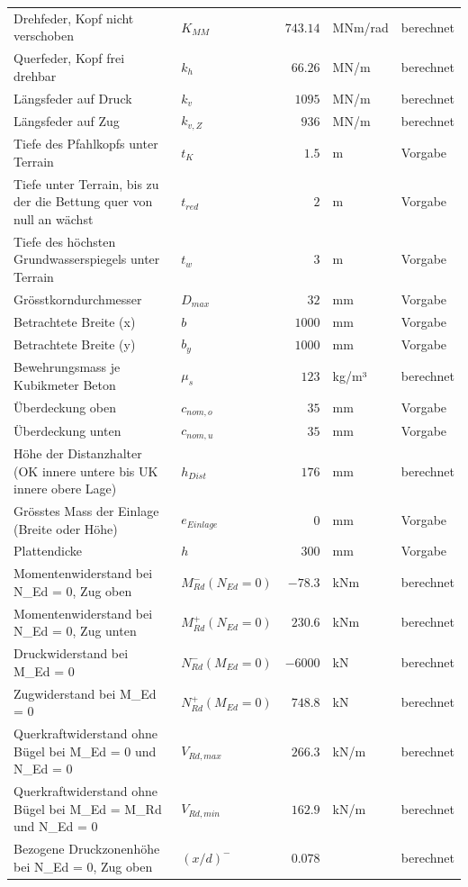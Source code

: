 \documentclass[11pt,a4paper]{article}
\begin{document}
\begin{xltabular}{\linewidth}{>{\raggedright\arraybackslash}Xlrll}
Drehfeder, Kopf nicht verschoben & $K_{MM}$ & $743.14$ & MNm/rad & berechnet \\
Querfeder, Kopf frei drehbar & $k_h$ & $66.26$ & MN/m & berechnet \\
Längsfeder auf Druck & $k_v$ & $1095$ & MN/m & berechnet \\
Längsfeder auf Zug & $k_{v,Z}$ & $936$ & MN/m & berechnet \\
Tiefe des Pfahlkopfs unter Terrain & $t_K$ & $1.5$ & m & Vorgabe \\
Tiefe unter Terrain, bis zu der die Bettung quer von null an wächst & $t_{red}$ & $2$ & m & Vorgabe \\
Tiefe des höchsten Grundwasserspiegels unter Terrain & $t_w$ & $3$ & m & Vorgabe \\
Grösstkorndurchmesser & $D_{max}$ & $32$ & mm & Vorgabe \\
Betrachtete Breite (x) & $b$ & $1000$ & mm & Vorgabe \\
Betrachtete Breite (y) & $b_y$ & $1000$ & mm & Vorgabe \\
Bewehrungsmass je Kubikmeter Beton & $\mu_s$ & $123$ & kg/m³ & berechnet \\
Überdeckung oben & $c_{nom,o}$ & $35$ & mm & Vorgabe \\
Überdeckung unten & $c_{nom,u}$ & $35$ & mm & Vorgabe \\
Höhe der Distanzhalter (OK innere untere bis UK innere obere Lage) & $h_{Dist}$ & $176$ & mm & berechnet \\
Grösstes Mass der Einlage (Breite oder Höhe) & $e_{Einlage}$ & $0$ & mm & Vorgabe \\
Plattendicke & $h$ & $300$ & mm & Vorgabe \\
Momentenwiderstand bei N\_Ed = 0, Zug oben & $M_{Rd}^{-}(N_{Ed} = 0)$ & $-78.3$ & kNm & berechnet \\
Momentenwiderstand bei N\_Ed = 0, Zug unten & $M_{Rd}^{+}(N_{Ed} = 0)$ & $230.6$ & kNm & berechnet \\
Druckwiderstand bei M\_Ed = 0 & $N_{Rd}^{-}(M_{Ed} = 0)$ & $-6000$ & kN & berechnet \\
Zugwiderstand bei M\_Ed = 0 & $N_{Rd}^{+}(M_{Ed} = 0)$ & $748.8$ & kN & berechnet \\
Querkraftwiderstand ohne Bügel bei M\_Ed = 0 und N\_Ed = 0 & $V_{Rd,max}$ & $266.3$ & kN/m & berechnet \\
Querkraftwiderstand ohne Bügel bei M\_Ed = M\_Rd und N\_Ed = 0 & $V_{Rd,min}$ & $162.9$ & kN/m & berechnet \\
Bezogene Druckzonenhöhe bei N\_Ed = 0, Zug oben & $\left(x/d\right)^{-}$ & $0.078$ &  & berechnet \\

\end{xltabular}
\end{document}
